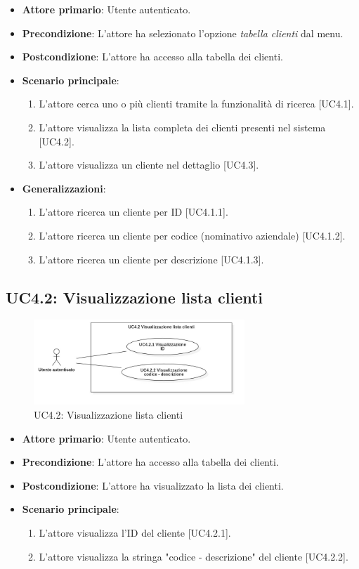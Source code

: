 \begin{itemize}
\item \textbf{Attore primario}: Utente autenticato.
\item \textbf{Precondizione}: L'attore ha selezionato l'opzione \textit{tabella clienti} dal menu.
\item \textbf{Postcondizione}: L'attore ha accesso alla tabella dei clienti.
\item \textbf{Scenario principale}: 
\begin{enumerate}
\item L'attore cerca uno o più clienti tramite la funzionalità di ricerca [UC4.1].
\item L'attore visualizza la lista completa dei clienti presenti nel sistema [UC4.2].
\item L'attore visualizza un cliente nel dettaglio [UC4.3].
\end{enumerate}
\item \textbf{Generalizzazioni}:
\begin{enumerate}
\item L'attore ricerca un cliente per ID [UC4.1.1].
\item L'attore ricerca un cliente per codice (nominativo aziendale) [UC4.1.2].
\item L'attore ricerca un cliente per descrizione [UC4.1.3].
\end{enumerate}
\end{itemize}

\pagebreak

\subsection{UC4.2: Visualizzazione lista clienti}
\begin{figure}[!h]
\centering
\includegraphics[width=300px]{../images/UC/.jpeg/UC4.2-visualizzazioneListaClienti.jpg}
\caption{UC4.2: Visualizzazione lista clienti}
\end{figure}

\begin{itemize}
\item \textbf{Attore primario}: Utente autenticato.
\item \textbf{Precondizione}: L'attore ha accesso alla tabella dei clienti.
\item \textbf{Postcondizione}: L'attore ha visualizzato la lista dei clienti.
\item \textbf{Scenario principale}: 
\begin{enumerate}
\item L'attore visualizza l'ID del cliente [UC4.2.1].
\item L'attore visualizza la stringa "codice - descrizione" del cliente [UC4.2.2].
\end{enumerate}
\end{itemize}

